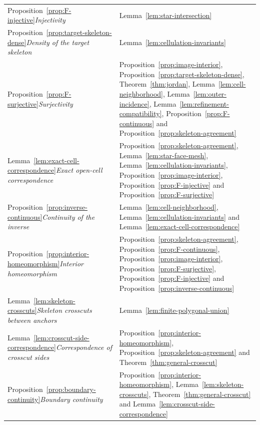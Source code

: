 \documentclass[11pt]{article}
\theoremstyle{mainplain}
\theoremstyle{mainroman}
\theoremstyle{definition}
\numberwithin{equation}{section}
\begin{document}
\begin{longtable}{@{}>{\raggedright\arraybackslash}p{}>{\raggedright\arraybackslash}p{}@{}}
Proposition~\ref{prop:F-injective}\newline\emph{Injectivity} & Lemma~\ref{lem:star-intersection} \\
Proposition~\ref{prop:target-skeleton-dense}\newline\emph{Density of the target skeleton} & Lemma~\ref{lem:cellulation-invariants} \\
Proposition~\ref{prop:F-surjective}\newline\emph{Surjectivity} & Proposition~\ref{prop:image-interior}, Proposition~\ref{prop:target-skeleton-dense}, Theorem~\ref{thm:jordan}, Lemma~\ref{lem:cell-neighborhood}, Lemma~\ref{lem:outer-incidence}, Lemma~\ref{lem:refinement-compatibility}, Proposition~\ref{prop:F-continuous} and Proposition~\ref{prop:skeleton-agreement} \\
Lemma~\ref{lem:exact-cell-correspondence}\newline\emph{Exact open-cell correspondence} & Proposition~\ref{prop:skeleton-agreement}, Lemma~\ref{lem:star-face-mesh}, Lemma~\ref{lem:cellulation-invariants}, Proposition~\ref{prop:image-interior}, Proposition~\ref{prop:F-injective} and Proposition~\ref{prop:F-surjective} \\
Proposition~\ref{prop:inverse-continuous}\newline\emph{Continuity of the inverse} & Lemma~\ref{lem:cell-neighborhood}, Lemma~\ref{lem:cellulation-invariants} and Lemma~\ref{lem:exact-cell-correspondence} \\
Proposition~\ref{prop:interior-homeomorphism}\newline\emph{Interior homeomorphism} & Proposition~\ref{prop:skeleton-agreement}, Proposition~\ref{prop:F-continuous}, Proposition~\ref{prop:image-interior}, Proposition~\ref{prop:F-surjective}, Proposition~\ref{prop:F-injective} and Proposition~\ref{prop:inverse-continuous} \\
Lemma~\ref{lem:skeleton-crosscuts}\newline\emph{Skeleton crosscuts between anchors} & Lemma~\ref{lem:finite-polygonal-union} \\
Lemma~\ref{lem:crosscut-side-correspondence}\newline\emph{Correspondence of crosscut sides} & Proposition~\ref{prop:interior-homeomorphism}, Proposition~\ref{prop:skeleton-agreement} and Theorem~\ref{thm:general-crosscut} \\
Proposition~\ref{prop:boundary-continuity}\newline\emph{Boundary continuity} & Proposition~\ref{prop:interior-homeomorphism}, Lemma~\ref{lem:skeleton-crosscuts}, Theorem~\ref{thm:general-crosscut} and Lemma~\ref{lem:crosscut-side-correspondence} \\

\end{longtable}
\end{document}
